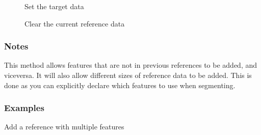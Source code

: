 \documentclass[letterpaper,10pt,english]{sphinxmanual}
\begin{document}
\begin{fulllineitems}
\begin{description}
\item[{{\hyperref[\detokenize{generated/seg1d.Segmenter.set_target:seg1d.Segmenter.set_target}]{}}}] \leavevmode
\sphinxAtStartPar
Set the target data

\item[{{\hyperref[\detokenize{generated/seg1d.Segmenter.clear_reference:seg1d.Segmenter.clear_reference}]{}}}] \leavevmode
\sphinxAtStartPar
Clear the current reference data

\end{description}


\subsubsection*{Notes}

\sphinxAtStartPar
This method allows features that are not in previous references to be
added, and vice\sphinxhyphen{}versa.
It will also allow different sizes of reference data to be added.
This is done as you can explicitly declare which features to use when
segmenting.
\subsubsection*{Examples}

\sphinxAtStartPar
Add a reference with multiple features

\begin{sphinxVerbatim}[commandchars=\\\{\}]
 
   
  
  
  
\end{sphinxVerbatim}


\end{fulllineitems}
\end{document}
